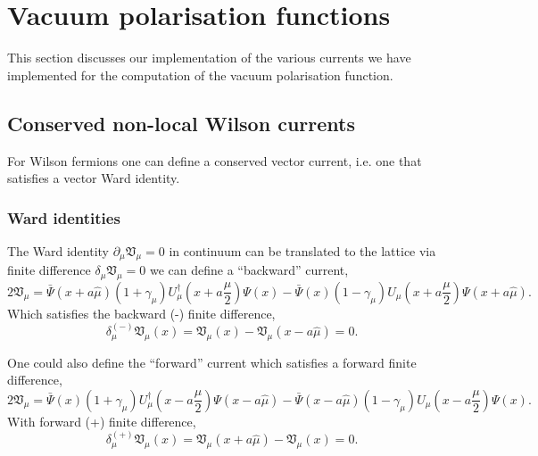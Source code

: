 \section{Vacuum polarisation functions}

This section discusses our implementation of the various currents
we have implemented for the computation of the vacuum polarisation
function.

\subsection{Conserved non-local Wilson currents}

For Wilson fermions one can define a conserved vector current, i.e.
one that satisfies a vector Ward identity.

\subsubsection{Ward identities}

The Ward identity $\partial_\mu \mathfrak{V}_\mu = 0$
in continuum can be translated to the lattice via finite difference
$\delta_\mu \mathfrak{V}_\mu = 0 $ we can define a ``backward'' current,
\begin{equation}
2\mathfrak{V}_\mu=
\bar{\Psi}\left(x+a\hat{\mu}\right)\left( 1 + \gamma_\mu \right)U_\mu^{\dagger}\left(x+a\frac{\mu}{2}\right)\Psi(x)
-\bar{\Psi}(x)\left( 1 - \gamma_\mu \right)U_\mu\left(x+a\frac{\mu}{2}\right)\Psi\left(x+a\hat{\mu}\right).
\end{equation}
Which satisfies the backward (-) finite difference,
\begin{equation}
\delta_\mu^{(-)}\mathfrak{V}_\mu(x) = \mathfrak{V}_\mu(x) - \mathfrak{V}_\mu(x-a\hat{\mu}) = 0.
\end{equation}

One could also define the ``forward'' current which satisfies
a forward finite difference,
\begin{equation}
2\mathfrak{V}_\mu=
\bar{\Psi}(x)\left( 1 + \gamma_\mu \right)U_\mu^{\dagger}\left(x-a\frac{\mu}{2}\right)\Psi\left(x-a\hat{\mu}\right)
-\bar{\Psi}\left(x-a\hat{\mu}\right)\left( 1 - \gamma_\mu \right)U_\mu\left(x-a\frac{\mu}{2}\right)\Psi(x).
\end{equation}
With forward (+) finite difference,
\begin{equation}
\delta_\mu^{(+)}\mathfrak{V}_\mu(x) = \mathfrak{V}_\mu(x+a\hat{\mu}) - \mathfrak{V}_\mu(x) = 0.
\end{equation}

